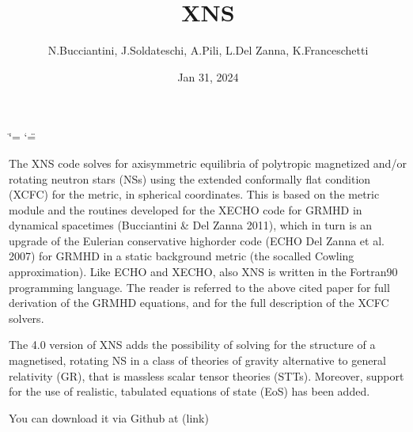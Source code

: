 \documentclass[letterpaper,10pt,english]{sphinxmanual}
\title{XNS}
\date{Jan 31, 2024}
\author{N.Bucciantini, J.Soldateschi, A.Pili, L.Del Zanna, K.Franceschetti}
\begin{document}
\ifdefined\shorthandoff
  \ifnum\catcode`\=\string=\active\shorthandoff{=}\fi
  \ifnum\catcode`\"=\active{}\fi
\fi

\pagestyle{empty}
\sphinxmaketitle
\pagestyle{plain}
\sphinxtableofcontents
\pagestyle{normal}
\label{\detokenize{index::doc}}
\sphinxstepscope



\sphinxAtStartPar
The XNS code solves for axisymmetric equilibria of polytropic magnetized and/or rotating neutron stars (NSs) using the extended conformally flat condition (XCFC) for the metric, in spherical coordinates. This is based on the metric module and the routines developed for the X\sphinxhyphen{}ECHO code for GRMHD in dynamical spacetimes (Bucciantini \& Del Zanna 2011), which in turn is an upgrade of the Eulerian conservative high\sphinxhyphen{}order code (ECHO Del Zanna et al. 2007) for GRMHD in a static background metric (the so\sphinxhyphen{}called Cowling approximation). Like ECHO and X\sphinxhyphen{}ECHO, also XNS is written in the Fortran90 programming language. The reader is referred to the above cited paper for full derivation of the GRMHD equations, and for the full description of the XCFC solvers.

\sphinxAtStartPar
The 4.0 version of XNS adds the possibility of solving for the structure of a magnetised, rotating NS in a class of theories of gravity alternative to general relativity (GR), that is massless scalar tensor theories (STTs). Moreover, support for the use of realistic, tabulated equations of state (EoS) has been added.

\sphinxAtStartPar
You can download it via Github at (link)
\end{document}
